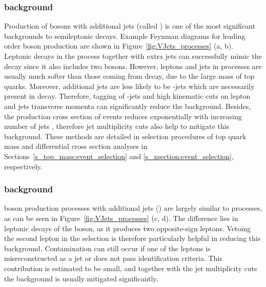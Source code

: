 \subsubsection*{\WpJets background}
Production of \W bosons with additional jets (called \WpJets) is one of the most significant backgrounds to semileptonic
\ttbar decays. Example Feynman diagrams for leading order \W boson production are shown in
Figure~\ref{fig:VJets_processes} (a, b). Leptonic decays in the \WpJets process together with extra jets can
successfully mimic the \ttbar decay since it also includes two \W bosons. However, leptons and jets in \WpJets processes
are usually much softer than those coming from \ttbar decay, due to the large mass of top quarks. Moreover, additional
jets are less likely to be \cPqb-jets which are necessarily present in \ttbar decay. Therefore, tagging of \cPqb-jets
and high kinematic cuts on lepton and jets transverse momenta can significantly reduce the
\WpJets background. Besides, the production cross section of \WpJets events reduces exponentially with increasing number
of jets \autocite{multijet_WZ}, therefore jet multiplicity cuts also help to mitigate this background. These methods are
detailed in selection procedures of top quark mass and differential cross section analyses in
Sections~\ref{s_top_mass:event_selection} and \ref{s_xsection:event_selection}, respectively.

\subsubsection*{\ZpJets background}
\Z boson production processes with additional jets (\ZpJets) are largely similar to \WpJets processes, as can be seen in
Figure~\ref{fig:VJets_processes} (c, d). The difference lies in leptonic decays of the \Z boson, as it produces two
opposite-sign leptons. Vetoing the second lepton in the selection is therefore particularly helpful in reducing this
background. Contamination can still occur if one of the leptons is misreconstructed as a jet or does not pass
identification criteria. This contribution is estimated to be small, and together with the jet multiplicity cuts the
\ZpJets background is usually mitigated significantly.



